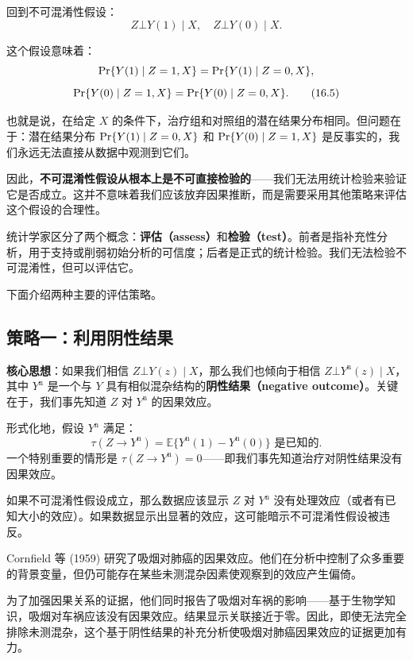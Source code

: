 回到不可混淆性假设：
\[
Z \bot Y(1) \mid X, \quad Z \bot Y(0) \mid X .
\tag{16.4}
\label{eq:16-unconfoundedness-formal}
\]

这个假设意味着：
\[
\operatorname{Pr}\{Y(1) \mid Z = 1, X\} = \operatorname{Pr}\{Y(1) \mid Z = 0, X\},
\]
\[
\operatorname{Pr}\{Y(0) \mid Z = 1, X\} = \operatorname{Pr}\{Y(0) \mid Z = 0, X\} .
\tag{16.5}
\label{eq:16-unconfoundedness-meaning}
\]

也就是说，在给定 $X$ 的条件下，治疗组和对照组的潜在结果分布相同。但问题在于：潜在结果分布 $\operatorname{Pr}\{Y(1) \mid Z = 0, X\}$ 和 $\operatorname{Pr}\{Y(0) \mid Z = 1, X\}$ 是反事实的，我们永远无法直接从数据中观测到它们。

因此，\textbf{不可混淆性假设从根本上是不可直接检验的}——我们无法用统计检验来验证它是否成立。这并不意味着我们应该放弃因果推断，而是需要采用其他策略来评估这个假设的合理性。

统计学家区分了两个概念：\textbf{评估（assess）}和\textbf{检验（test）}。前者是指补充性分析，用于支持或削弱初始分析的可信度；后者是正式的统计检验。我们无法检验不可混淆性，但可以评估它。

下面介绍两种主要的评估策略。

\subsection{策略一：利用阴性结果}\label{sec:16-negative-outcomes}

\textbf{核心思想}：如果我们相信 $Z \bot Y(z) \mid X$，那么我们也倾向于相信 $Z \bot Y^{\mathrm{n}}(z) \mid X$，其中 $Y^{\mathrm{n}}$ 是一个与 $Y$ 具有相似混杂结构的\textbf{阴性结果（negative outcome）}。关键在于，我们事先知道 $Z$ 对 $Y^{\mathrm{n}}$ 的因果效应。

形式化地，假设 $Y^{\mathrm{n}}$ 满足：
\[
\tau(Z \to Y^{\mathrm{n}}) = \mathbb{E}\{Y^{\mathrm{n}}(1) - Y^{\mathrm{n}}(0)\} \text{ 是已知的}.
\label{eq:16-negative-outcome-effect}
\tag{16.6}
\]
一个特别重要的情形是 $\tau(Z \to Y^{\mathrm{n}}) = 0$——即我们事先知道治疗对阴性结果没有因果效应。

如果不可混淆性假设成立，那么数据应该显示 $Z$ 对 $Y^{\mathrm{n}}$ 没有处理效应（或者有已知大小的效应）。如果数据显示出显著的效应，这可能暗示不可混淆性假设被违反。

\begin{Example}\label{ex:16-cornfield}
Cornfield 等 (1959) 研究了吸烟对肺癌的因果效应。他们在分析中控制了众多重要的背景变量，但仍可能存在某些未测混杂因素使观察到的效应产生偏倚。

为了加强因果关系的证据，他们同时报告了吸烟对车祸的影响——基于生物学知识，吸烟对车祸应该没有因果效应。结果显示关联接近于零。因此，即使无法完全排除未测混杂，这个基于阴性结果的补充分析使吸烟对肺癌因果效应的证据更加有力。
\end{Example}


